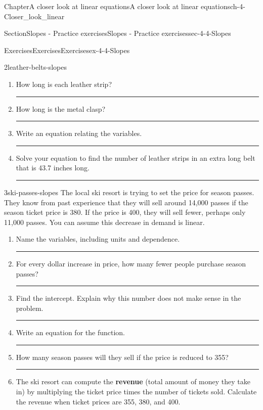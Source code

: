 \documentclass[twoside,11pt,]{book}
\newcommand{\terminology}[1]{\textbf{#1}}
\newlength{\workspacestrutwidth}
\numberwithin{equation}{section}
\begin{document}
\begin{chapterptx}{Chapter}{A closer look at linear equations}{}{A closer look at linear equations}{}{}{ch-4-Closer_look_linear}
\begin{sectionptx}{Section}{Slopes - Practice exercises}{}{Slopes - Practice exercises}{}{}{sec-4-4-Slopes}
\begin{exercises-subsection-numberless}{Exercises}{Exercises}{}{Exercises}{}{}{ex-4-4-Slopes}
\begin{divisionexercise}{2}{}{}{leather-belts-slopes}
\begin{enumerate}[label=(\alph*),ref=\alph*]
\par\rule{\workspacestrutwidth}{0.75in}%
\item{}How long is each leather strip?%
\par\rule{\workspacestrutwidth}{0.75in}%
\item{}How long is the metal clasp?%
\par\rule{\workspacestrutwidth}{0.75in}%
\item{}Write an equation relating the variables.%
\par\rule{\workspacestrutwidth}{0.75in}%
\item{}Solve your equation to find the number of leather strips in an extra long belt that is 43.7 inches long.%
\par\rule{\workspacestrutwidth}{0.75in}%
\end{enumerate}%
\end{divisionexercise}%
\clearpage
\begin{divisionexercise}{3}{}{}{ski-passes-slopes}%
The local ski resort is trying to set the price for season passes. They know from past experience that they will sell around 14,000 passes if the season ticket price is \textdollar{}380. If the price is \textdollar{}400, they will sell fewer, perhaps only 11,000 passes. You can assume this decrease in demand is linear.%
\begin{enumerate}[label=(\alph*),ref=\alph*]%
\item{}Name the variables, including units and dependence.%
\par\rule{\workspacestrutwidth}{0.6in}%
\item{}For every dollar increase in price, how many fewer people purchase season passes?%
\par\rule{\workspacestrutwidth}{0.75in}%
\item{}Find the intercept. Explain why this number does not make sense in the problem.%
\par\rule{\workspacestrutwidth}{0.75in}%
\item{}Write an equation for the function. %
\par\rule{\workspacestrutwidth}{0.75in}%
\item{}How many season passes will they sell if the price is reduced to \textdollar{}355?%
\par\rule{\workspacestrutwidth}{0.75in}%
\item{}The ski resort can compute the \terminology{revenue} (total amount of money they take in) by multiplying the ticket price times the number of tickets sold. Calculate the revenue when ticket prices are \textdollar{}355, \textdollar{}380, and \textdollar{}400. %

\end{enumerate}
\end{divisionexercise}
\end{exercises-subsection-numberless}
\end{sectionptx}
\end{chapterptx}
\end{document}
